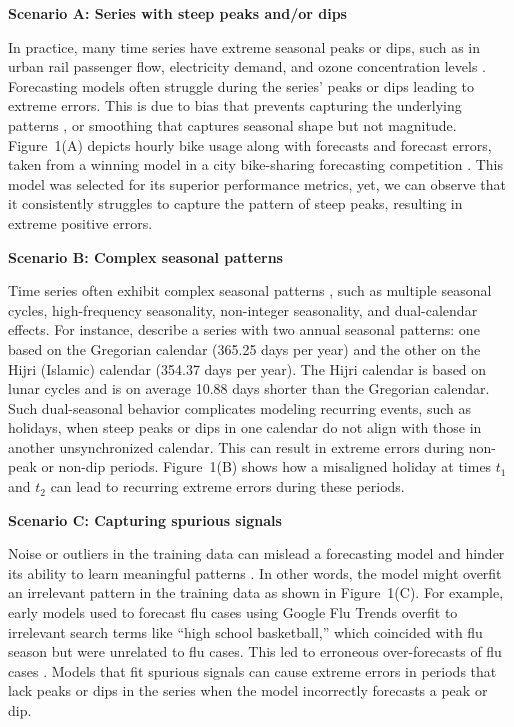 \documentclass[12pt]{article}
\newenvironment{scenario}[1]{%
  \par\vspace{1ex}\noindent\textbf{#1}\par\vspace{0.5ex}}{\par}
\begin{document}
\begin{scenario}{Scenario A: Series with steep peaks and/or dips}
In practice, many time series have extreme seasonal peaks or dips, such as in urban rail passenger flow, electricity demand, and ozone concentration levels  \citep{li2024, amaraouali2023, marvin2022}. Forecasting models often struggle during the series' peaks or dips leading to extreme errors. This is due to bias that prevents capturing the underlying patterns \citep{lin2023}, or  smoothing that captures seasonal shape but not magnitude. Figure~1(A) depicts %
hourly bike usage along with forecasts and forecast errors, taken from a winning model in a city bike-sharing forecasting competition \citep{mohit2020}. This model was selected for its superior performance metrics, yet, we can observe that it consistently struggles to capture the pattern of steep peaks, resulting in extreme positive errors.
\end{scenario}

\begin{scenario}{Scenario B: Complex seasonal patterns}

Time series often exhibit complex seasonal patterns \citep{zhao2024}, such as multiple seasonal cycles, high-frequency seasonality, non-integer seasonality, and dual-calendar effects. For instance, \cite{delivera2011} describe a series with two annual seasonal patterns: one based on the Gregorian calendar (365.25 days per year) and the other on the Hijri (Islamic) calendar (354.37 days per year). The Hijri calendar is based on lunar cycles and is on average 10.88 days shorter than the Gregorian calendar. Such dual-seasonal behavior complicates modeling recurring events, such as holidays, when steep peaks or dips in one calendar do not align with those in another unsynchronized calendar. This can %
result in extreme errors during non-peak or non-dip periods. %
Figure~1(B) shows %
how a misaligned holiday at times $t_1$ and $t_2$ can lead to recurring extreme errors during these periods.
\end{scenario}

\begin{scenario}{Scenario C: Capturing spurious signals}

Noise or outliers in the training data can mislead a forecasting model and hinder its ability to learn meaningful patterns \citep{cakmak2024}. In other words, the model might overfit an irrelevant pattern in the training data as shown in Figure~1(C). For example, early models used to forecast flu cases using Google Flu Trends overfit to irrelevant search terms like ``high school basketball,'' which coincided with flu season but were unrelated to flu cases. This led to erroneous over-forecasts of flu cases \citep{lazer2014}. Models that fit spurious signals can cause extreme errors in periods that lack peaks or dips in the series when the model incorrectly forecasts a peak or dip.
\end{scenario}
\end{document}
